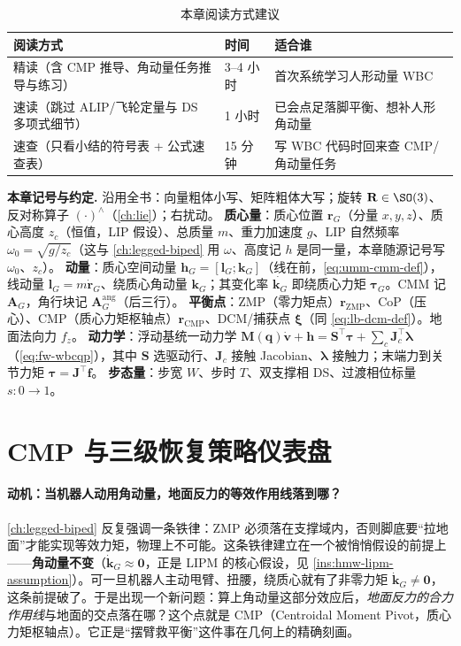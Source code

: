 \begin{table}[H]\centering\small
\caption{本章阅读方式建议}
\begin{tabular}{lll}
\toprule
阅读方式 & 时间 & 适合谁 \\
\midrule
精读（含 CMP 推导、角动量任务推导与练习） & 3--4 小时 & 首次系统学习人形动量 WBC \\
速读（跳过 ALIP/飞轮定量与 DS 多项式细节） & 1 小时 & 已会点足落脚平衡、想补人形角动量 \\
速查（只看小结的符号表 + 公式速查表） & 15 分钟 & 写 WBC 代码时回来查 CMP/角动量任务 \\
\bottomrule
\end{tabular}
\end{table}

\begin{note}
\textbf{本章记号与约定.}\;
沿用全书：向量粗体小写、矩阵粗体大写；旋转 $\mathbf R\in\SO(3)$、反对称算子 $(\cdot)^\wedge$（\cref{ch:lie}）；右扰动。
\textbf{质心量}：质心位置 $\mathbf r_G$（分量 $x,y,z$）、质心高度 $z_c$（恒值，LIP 假设）、总质量 $m$、重力加速度 $g$、LIP 自然频率 $\omega_0=\sqrt{g/z_c}$（这与 \cref{ch:legged-biped} 用 $\omega$、高度记 $h$ 是同一量，本章随源记号写 $\omega_0$、$z_c$）。
\textbf{动量}：质心空间动量 $\mathbf h_G=[\mathbf l_G;\mathbf k_G]$（线在前，\cref{eq:umm-cmm-def}），线动量 $\mathbf l_G=m\dot{\mathbf r}_G$、绕质心角动量 $\mathbf k_G$；其变化率 $\dot{\mathbf k_G}$ 即绕质心力矩 $\boldsymbol\tau_G$。CMM 记 $\mathbf A_G$，角行块记 $\mathbf A_G^{\mathrm{ang}}$（后三行）。
\textbf{平衡点}：ZMP（零力矩点）$\mathbf r_{\mathrm{ZMP}}$、CoP（压心）、CMP（质心力矩枢轴点）$\mathbf r_{\mathrm{CMP}}$、DCM/捕获点 $\boldsymbol\xi$（同 \cref{eq:lb-dcm-def}）。地面法向力 $f_z$。
\textbf{动力学}：浮动基统一动力学 $\mathbf M(\mathbf q)\dot{\mathbf v}+\mathbf h=\mathbf S^\top\boldsymbol\tau+\sum_c\mathbf J_c^\top\boldsymbol\lambda$（\cref{eq:fw-wbcqp}），其中 $\mathbf S$ 选驱动行、$\mathbf J_c$ 接触 Jacobian、$\boldsymbol\lambda$ 接触力；末端力到关节力矩 $\boldsymbol\tau=\mathbf J^\top\mathbf f$。
\textbf{步态量}：步宽 $W$、步时 $T$、双支撑相 DS、过渡相位标量 $s:0\!\to\!1$。
\end{note}

\section{CMP 与三级恢复策略仪表盘}
\label{sec:hmw-cmp}

\paragraph{动机：当机器人动用角动量，地面反力的等效作用线落到哪？}
\cref{ch:legged-biped} 反复强调一条铁律：ZMP 必须落在支撑域内，否则脚底要“拉地面”才能实现等效力矩，物理上不可能。这条铁律建立在一个被悄悄假设的前提上——\textbf{角动量不变}（$\dot{\mathbf k}_G\approx\mathbf 0$，正是 LIPM 的核心假设，见 \cref{ins:hmw-lipm-assumption}）。可一旦机器人主动甩臂、扭腰，绕质心就有了非零力矩 $\dot{\mathbf k}_G\ne\mathbf 0$，这条前提破了。于是出现一个新问题：算上角动量这部分效应后，\emph{地面反力的合力作用线}与地面的交点落在哪？这个点就是 CMP（Centroidal Moment Pivot，质心力矩枢轴点）。它正是“摆臂救平衡”这件事在几何上的精确刻画。

